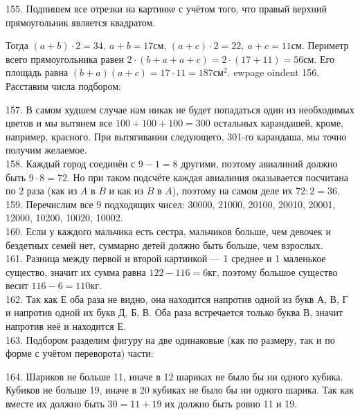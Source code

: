 155. Подпишем все отрезки на картинке с учётом того, что правый верхний прямоугольник является квадратом.
\begin{center}
\begin{figure}[ht!]
\end{figure}
\end{center}
Тогда $(a+b)\cdot2=34,\ a+b=17$см, $(a+c)\cdot2=22,\ a+c=11$см. Периметр всего прямоугольника равен $2\cdot(b+a+a+c)=2\cdot(17+11)=56$см. Его площадь равна $(b+a)(a+c)=17\cdot11=187\text{см}^2.$
ewpage
oindent
156. Расставим числа подбором:
\begin{center}
\begin{figure}[ht!]
\end{figure}
\end{center}
157. В самом худшем случае нам никак не будет попадаться один из необходимых цветов и мы вытянем все $100+100+100=300$ остальных карандашей, кроме, например, красного. При вытягивании следующего, 301-го карандаша, мы точно получим желаемое.\\
158. Каждый город соединён с $9-1=8$ другими, поэтому авиалиний должно быть $9\cdot8=72.$ Но при таком подсчёте каждая авиалиния оказывается посчитана по 2 раза (как из $A$ в $B$ и как из $B$ в $A$), поэтому на самом деле их $72:2=36.$\\
159. Перечислим все 9 подходящих чисел: 30000, 21000, 20100, 20010, 20001, 12000, 10200, 10020, 10002.\\
160. Если у каждого мальчика есть сестра, мальчиков больше, чем девочек и бездетных семей нет, суммарно детей должно быть больше, чем взрослых.\\
161. Разница между первой и второй картинкой --- 1 среднее и 1 маленькое существо, значит их сумма равна $122-116=6$кг, поэтому большое существо весит $116-6=110$кг.\\
162. Так как Е оба раза не видно, она находится напротив одной из букв А, В, Г и напротив одной их букв Д, Б, В. Оба раза встречается только буква В, значит напротив неё и находится Е.\\
163. Подбором разделим фигуру на две одинаковые (как по размеру, так и по форме с учётом переворота) части:
\begin{center}
\begin{figure}[ht!]
\end{figure}
\end{center}
164. Шариков не больше 11, иначе в 12 шариках не было бы ни одного кубика. Кубиков не больше 19, иначе в 20 кубиках не было бы ни одного шарика. Так как вместе их должно быть $30=11+19$ их должно быть ровно 11 и 19.\\

